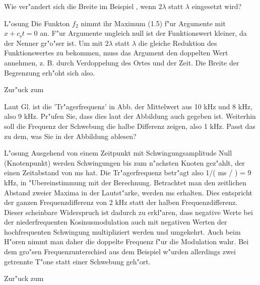 \begin{MExercises}
\begin{MExercise}
Wie ver"andert sich die Breite im Beispiel , wenn $2\lambda$ statt $\lambda$ eingesetzt wird?

\begin{MHint}{L"osung} 
Die Funkton $f_2$ nimmt ihr Maximum (1.5) f"ur Argumente mit $x+c_\mathrm{s}t=0$ an. F"ur Argumente ungleich null ist der Funktionswert kleiner, da der Nenner gr"o"ser ist. Um mit $2\lambda$ statt $\lambda$ die gleiche Reduktion des Funktionswertes zu bekommen, muss das Argument den doppelten Wert annehmen, z. B. durch Verdoppelung des Ortes und der Zeit. Die Breite der Begrenzung erh"oht sich also. 
\end{MHint}

Zur"uck zum 
\end{MExercise}

\begin{MExercise}
Laut Gl.  ist die 'Tr"agerfrequenz' in Abb.  der Mittelwert aus 10 kHz und 8 kHz, also 9 kHz. Pr"ufen Sie, dass dies laut der Abbildung auch gegeben ist. Weiterhin soll die Frequenz der Schwebung die halbe Differenz zeigen, also 1 kHz. Passt das zu dem, was Sie in der Abbildung ablesen?

\begin{MHint}{L"osung}
Ausgehend von einem Zeitpunkt mit Schwingungsamplitude Null (Knotenpunkt) werden  Schwingungen bis zum n"achsten Knoten gez"ahlt, der einen Zeitabstand von  ms hat. Die Tr"agerfrequenz betr"agt also 1/( ms / ) = 9 kHz, in "Ubereinstimmung mit der Berechnung. Betrachtet man den zeitlichen Abstand zweier Maxima in der Lautst"arke, werden  ms erhalten. Dies entspricht der ganzen Frequenzdifferenz von 2 kHz statt der halben Frequenzdifferenz. Dieser scheinbare Widerspruch ist dadurch zu erkl"aren, dass negative Werte bei der niederfrequenten Kosinusmodulation auch mit negativen Werten der hochfrequenten Schwingung multipliziert werden und umgekehrt. Auch beim H"oren nimmt man daher die doppelte Frequenz f"ur die Modulation wahr. Bei dem gro"sen Frequenzunterschied aus dem Beispiel w"urden allerdings zwei getrennte T"one statt einer Schwebung geh"ort.  
\end{MHint}

Zur"uck zum 
\end{MExercise}
\end{MExercises}


